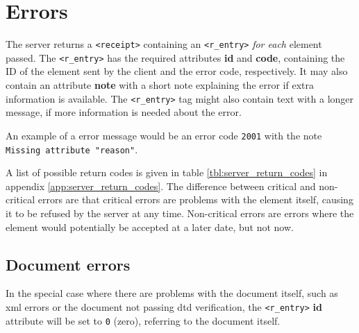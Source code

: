 \newpage
\section{Errors}
\label{sec:errors}

The server returns a \texttt{<receipt>} containing an \texttt{<r\_entry>}
\textit{for each} element passed. The \texttt{<r\_entry>} has the required
attributes \textbf{id} and \textbf{code}, containing the ID of the element sent
by the client and the error code, respectively. It may also contain an
attribute \textbf{note} with a short note explaining the error if extra
information is available. The \texttt{<r\_entry>} tag might also contain text
with a longer message, if more information is needed about the error. 

An example of a error message would be an error code \texttt{2001} with the
note \texttt{Missing attribute "reason"}.

A list of possible return codes is given in table \ref{tbl:server_return_codes}
in appendix \ref{app:server_return_codes}. The difference between critical and
non-critical errors are that critical errors are problems with the element
itself, causing it to be refused by the server at any time. Non-critical errors
are errors where the element would potentially be accepted at a later date, but
not now.

\subsection{Document errors}

In the special case where there are problems with the document itself, such as
\gls{xml} errors or the document not passing \gls{dtd} verification, the
\texttt{<r\_entry>} \textbf{id} attribute will be set to \texttt{0} (zero),
referring to the document itself. 
